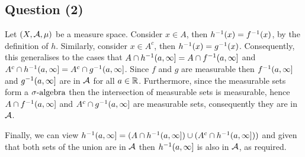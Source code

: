 \documentclass{article}
\begin{document}
\begin{center}
\section*{Question (2)}
\end{center}

\begin{flushleft}
    Let $(X, \mathcal{A}, \mu)$ be a measure space. Consider $x \in A$, then $h^{-1}(x) = f^{-1}(x)$, by the definition of $h$. Similarly, consider $x \in A^c$, then $h^{-1}(x) = g^{-1}(x)$. Consequently, this generalises to the cases that $A \cap h^{-1}(a, \infty] = A \cap f^{-1}(a, \infty]$ and $A^c \cap h^{-1}(a, \infty] = A^c \cap g^{-1}(a, \infty]$. Since $f$ and $g$ are measurable then $f^{-1}(a, \infty]$ and $g^{-1}(a, \infty]$ are in $\mathcal{A}$ for all $a \in \mathbb{R}$. Furthermore, since the measurable sets form a $\sigma\text{-algebra}$ then the intersection of measurable sets is measurable, hence $A \cap f^{-1}(a, \infty]$ and $A^c \cap g^{-1}(a, \infty]$ are measurable sets, consequently they are in $\mathcal{A}$. \newline 
    
    Finally, we can view $h^{-1}(a, \infty] = (A \cap h^{-1}(a, \infty]) \cup (A^c \cap h^{-1}(a, \infty]))$ and given that both sets of the union are in $\mathcal{A}$ then $h^{-1}(a, \infty]$ is also in $\mathcal{A}$, as required. 
\end{flushleft}
\end{document}
